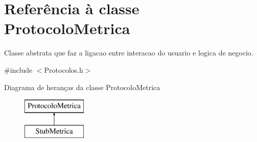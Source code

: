 \hypertarget{class_protocolo_metrica}{
\section{\-Referência à classe \-Protocolo\-Metrica}
\label{class_protocolo_metrica}
}


\-Classe abstrata que faz a ligacao entre interacao do usuario e logica de negocio.  




{\ttfamily \#include $<$\-Protocolos.\-h$>$}

\-Diagrama de heranças da classe \-Protocolo\-Metrica\begin{figure}[H]
\begin{center}
\leavevmode
\includegraphics[height=2.000000cm]{class_protocolo_metrica}
\end{center}
\end{figure}
